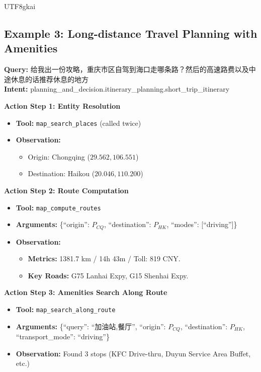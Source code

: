 \begin{CJK*}{UTF8}{gkai}
\subsection{Example 3: Long-distance Travel Planning with Amenities}
\begin{tcolorbox}[
    breakable,
    enhanced,
    colframe=color_amapblue,
    colback=mycolor,
    coltitle=white,
    title = {\textbf{Case Study: Cross-province Self-driving Guide}},
    fonttitle=\bfseries
]

\textbf{Query:} 给我出一份攻略，重庆市区自驾到海口走哪条路？然后的高速路费以及中途休息的话推荐休息的地方\\
\textbf{Intent:} planning\_and\_decision.itinerary\_planning.short\_trip\_itinerary
\tcblower

\textbf{Action Step 1: Entity Resolution}
\begin{itemize}[leftmargin=12pt, itemsep=0pt]
  \item \textbf{Tool:} \texttt{map\_search\_places} (called twice)
  \item \textbf{Observation:} 
    \begin{itemize}[leftmargin=10pt, itemsep=0pt]
        \item Origin: Chongqing ($29.562, 106.551$)
        \item Destination: Haikou ($20.046, 110.200$)
    \end{itemize}
\end{itemize}
\vspace{5pt}
\textbf{Action Step 2: Route Computation}
\begin{itemize}[leftmargin=12pt, itemsep=0pt]
  \item \textbf{Tool:} \texttt{map\_compute\_routes}
  \item \textbf{Arguments:} \{``origin'': $P_{CQ}$, ``destination'': $P_{HK}$, ``modes'': [``driving'']\}
  \item \textbf{Observation:} 
    \begin{itemize}[leftmargin=10pt]
        \item \textbf{Metrics:} 1381.7 km / 14h 43m / Toll: 819 CNY.
        \item \textbf{Key Roads:} G75 Lanhai Expy, G15 Shenhai Expy.
    \end{itemize}
\end{itemize}
\vspace{5pt}
\textbf{Action Step 3: Amenities Search Along Route}
\begin{itemize}[leftmargin=12pt, itemsep=0pt]
  \item \textbf{Tool:} \texttt{map\_search\_along\_route}
  \item \textbf{Arguments:} \{``query'': ``加油站,餐厅'', ``origin'': $P_{CQ}$, ``destination'': $P_{HK}$, ``transport\_mode'': ``driving''\}
  \item \textbf{Observation:} Found 3 stops (KFC Drive-thru, Duyun Service Area Buffet, etc.)
\end{itemize}


\end{tcolorbox}
\end{CJK*}
